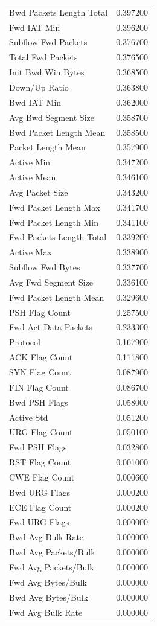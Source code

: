 \begin{tabular}{lr}
Bwd Packets Length Total & 0.397200 \\
Fwd IAT Min & 0.396200 \\
Subflow Fwd Packets & 0.376700 \\
Total Fwd Packets & 0.376500 \\
Init Bwd Win Bytes & 0.368500 \\
Down/Up Ratio & 0.363800 \\
Bwd IAT Min & 0.362000 \\
Avg Bwd Segment Size & 0.358700 \\
Bwd Packet Length Mean & 0.358500 \\
Packet Length Mean & 0.357900 \\
Active Min & 0.347200 \\
Active Mean & 0.346100 \\
Avg Packet Size & 0.343200 \\
Fwd Packet Length Max & 0.341700 \\
Fwd Packet Length Min & 0.341100 \\
Fwd Packets Length Total & 0.339200 \\
Active Max & 0.338900 \\
Subflow Fwd Bytes & 0.337700 \\
Avg Fwd Segment Size & 0.336100 \\
Fwd Packet Length Mean & 0.329600 \\
PSH Flag Count & 0.257500 \\
Fwd Act Data Packets & 0.233300 \\
Protocol & 0.167900 \\
ACK Flag Count & 0.111800 \\
SYN Flag Count & 0.087900 \\
FIN Flag Count & 0.086700 \\
Bwd PSH Flags & 0.058000 \\
Active Std & 0.051200 \\
URG Flag Count & 0.050100 \\
Fwd PSH Flags & 0.032800 \\
RST Flag Count & 0.001000 \\
CWE Flag Count & 0.000600 \\
Bwd URG Flags & 0.000200 \\
ECE Flag Count & 0.000200 \\
Fwd URG Flags & 0.000000 \\
Bwd Avg Bulk Rate & 0.000000 \\
Bwd Avg Packets/Bulk & 0.000000 \\
Fwd Avg Packets/Bulk & 0.000000 \\
Fwd Avg Bytes/Bulk & 0.000000 \\
Bwd Avg Bytes/Bulk & 0.000000 \\
Fwd Avg Bulk Rate & 0.000000 \\
\bottomrule
\end{tabular}
